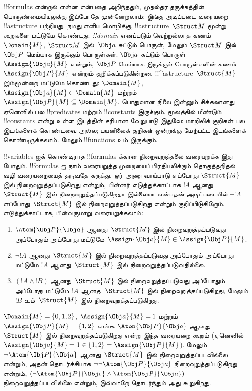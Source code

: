 \documentclass[../../../include/open-logic-section]{subfiles}
\begin{document}


!!{formula}s என்றால் என்ன என்பதை அறிந்ததும், முதல்தர தருக்கத்தின்
பொருண்மையியலுக்கு இப்போதே முன்னேறலாம்: இங்கு அடிப்படை வரையறை
!!a{structure} பற்றியது. நமது எளிய மொழிக்கு, !!a{structure}~$\Struct M$
மூன்று கூறுகளை மட்டுமே கொண்டது: \emph{!!{domain}} எனப்படும் வெற்றல்லாத
கணம்~$\Domain{M}$, $\Struct M$ இல்~$\Obj a$ சுட்டும் பொருள், மேலும்
$\Struct M$ இல்~$\Obj P$ மெய்யாக இருக்கும் பொருள்கள். $\Obj a$ சுட்டும்
பொருள்~$\Assign{\Obj a}{M}$ என்றும், $\Obj P$ மெய்யாக இருக்கும் பொருள்களின்
கணம்~$\Assign{\Obj P}{M}$ என்றும் குறிக்கப்படுகின்றன.
!!^a{structure}~$\Struct{M}$ இம்மூன்றை மட்டுமே கொண்டது:
$\Domain{M}$, $\Assign{\Obj a}{M} \in \Domain{M}$ மற்றும்
$\Assign{\Obj P}{M} \subseteq \Domain{M}$. பொதுவான நிலை இன்னும் சிக்கலானது;
ஏனெனில் பல !!{predicate}s மற்றும் !!{constant}s இருக்கும். மூலத்தில் மீண்டும்
!!{constant}s என்று உள்ள இடத்தின் சரியான வேறுபாடு இதுவே: மாறிலிக் குறிகள்
பல இடங்களைக் கொண்டவை அல்ல; பயனிலைக் குறிகள் ஒன்றுக்கு மேற்பட்ட இடங்களைக்
கொண்டிருக்கலாம். மேலும் !!{function}s உம் இருக்கும்.

!!{variable}s ஐக் கொண்டிராத !!{formula}s க்கான நிறைவுறுத்தலை வரையறுக்க
இது போதும். !!{formula}s ஐ நாம் வரையறுத்த முறையைப் பிரதிபலிக்கும்
தொகுத்தறிதல் வழி வரையறையைத் தருவதே கருத்து. ஓர் அணு வாய்பாடு எப்போது
$\Struct{M}$ இல் நிறைவுறுத்தப்படுகிறது என்றும், பின்னர் எடுத்துக்காட்டாக
$!A$ ஆனது~$\Struct{M}$ இல் நிறைவுறுத்தப்படுகிறதா இல்லையா என்பதன் அடிப்படையில்
$\lnot !A$ எப்போது~$\Struct{M}$ இல் நிறைவுறுத்தப்படுகிறது என்றும்
குறிப்பிடுகிறோம். எடுத்துக்காட்டாக, பின்வருமாறு வரையறுக்கலாம்:
\begin{enumerate}
  \item $\Atom{\Obj P}{\Obj a}$ ஆனது~$\Struct{M}$ இல் நிறைவுறுத்தப்படுவது
  அப்போதும் அப்போது மட்டுமே $\Assign{\Obj a}{M} \in \Assign{\Obj P}{M}$.
  \item $\lnot !A$ ஆனது~$\Struct{M}$ இல் நிறைவுறுத்தப்படுவது அப்போதும்
  அப்போது மட்டுமே $!A$ ஆனது~$\Struct{M}$ இல் நிறைவுறுத்தப்படுவதில்லை.
  \item $(!A \land !B)$ ஆனது~$\Struct{M}$ இல் நிறைவுறுத்தப்படுவது அப்போதும்
  அப்போது மட்டுமே $!A$ ஆனது~$\Struct{M}$ இல் நிறைவுறுத்தப்படுகிறது, மேலும்
  $!B$ உம்~$\Struct{M}$ இல் நிறைவுறுத்தப்படுகிறது.
\end{enumerate}
$\Domain{M} = \{0, 1, 2\}$, $\Assign{\Obj a}{M} = 1$ மற்றும்
$\Assign{\Obj P}{M} = \{1, 2\}$ என்க. $\Atom{\Obj P}{\Obj a}$ ஆனது
$\Struct{M}$ இல் நிறைவுறுத்தப்படுகிறது என்று இந்த வரையறை கூறும் (ஏனெனில்
$\Assign{\Obj a}{M} =  1 \in \{1,2\} = \Assign{\Obj P}{M}$). மேலும்
$\lnot \Atom{\Obj P}{\Obj a}$ ஆனது~$\Struct{M}$ இல் நிறைவுறுத்தப்படவில்லை
என்றும், அதன் தொடர்ச்சியாக $\lnot\lnot \Atom{\Obj P}{\Obj a}$
நிறைவுறுத்தப்படுகிறது என்றும், $(\lnot \Atom{\Obj P}{\Obj a} \land
\Atom{\Obj P}{\Obj a})$ நிறைவுறுத்தப்படவில்லை என்றும், இவ்வாறே தொடர்ந்தும்
அது கூறுகிறது.
\end{document}
